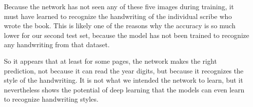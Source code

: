 Because the network has not seen any of these five images during training, it must have learned to recognize the handwriting of the individual scribe who wrote the book. This is likely one of the reasons why the accuracy is so much lower for our second test set, because the model has not been trained to recognize any handwriting from that dataset.

So it appears that at least for some pages, the network makes the right prediction, not because it can read the year digits, but because it recognizes the style of the handwriting. It is not what we intended the network to learn, but it nevertheless shows the potential of deep learning that the models can even learn to recognize handwriting styles.
